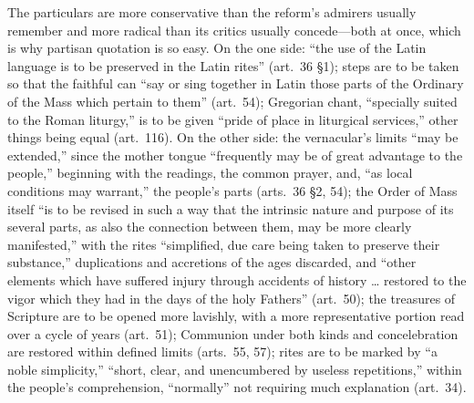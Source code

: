 The particulars are more conservative than the reform's admirers usually remember and more radical than its critics usually concede---both at once, which is why partisan quotation is so easy. On the one side: ``the use of the Latin language is to be preserved in the Latin rites'' (art.~36 \S1); steps are to be taken so that the faithful can ``say or sing together in Latin those parts of the Ordinary of the Mass which pertain to them'' (art.~54); Gregorian chant, ``specially suited to the Roman liturgy,'' is to be given ``pride of place in liturgical services,'' other things being equal (art.~116). On the other side: the vernacular's limits ``may be extended,'' since the mother tongue ``frequently may be of great advantage to the people,'' beginning with the readings, the common prayer, and, ``as local conditions may warrant,'' the people's parts (arts.~36 \S2, 54); the Order of Mass itself ``is to be revised in such a way that the intrinsic nature and purpose of its several parts, as also the connection between them, may be more clearly manifested,'' with the rites ``simplified, due care being taken to preserve their substance,'' duplications and accretions of the ages discarded, and ``other elements which have suffered injury through accidents of history \ldots{} restored to the vigor which they had in the days of the holy Fathers'' (art.~50); the treasures of Scripture are to be opened more lavishly, with a more representative portion read over a cycle of years (art.~51); Communion under both kinds and concelebration are restored within defined limits (arts.~55, 57); rites are to be marked by ``a noble simplicity,'' ``short, clear, and unencumbered by useless repetitions,'' within the people's comprehension, ``normally'' not requiring much explanation (art.~34).

